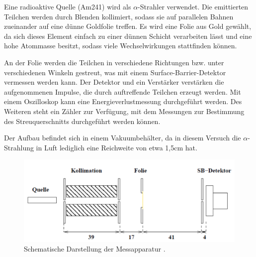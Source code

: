 Eine radioaktive Quelle (Am241) wird als $\alpha$-Strahler verwendet. Die emittierten Teilchen werden durch Blenden
kollimiert, sodass sie auf parallelen Bahnen zueinander auf eine dünne Goldfolie treffen. Es wird eine Folie aus Gold
gewählt, da sich dieses Element einfach zu einer dünnen Schicht verarbeiten lässt und eine hohe Atommasse besitzt, sodass
viele Wechselwirkungen stattfinden können.

An der Folie werden die Teilchen
in verschiedene Richtungen bzw. unter verschiedenen Winkeln gestreut, was mit einem Surface-Barrier-Detektor vermessen
werden kann. Der Detektor und ein Verstärker verstärken die aufgenommenen Impulse, die durch auftreffende Teilchen erzeugt
werden. Mit einem Oszilloskop kann eine Energieverlustmessung durchgeführt werden. Des Weiteren steht ein Zähler zur
Verfügung, mit dem Messungen zur Bestimmung des Streuquerschnitts durchgeführt werden können.

Der Aufbau befindet sich in einem Vakuumbehälter, da in diesem Versuch die $\alpha$-Strahlung in Luft lediglich eine
Reichweite von etwa 1,5cm hat.

\begin{figure}
\centering
\includegraphics[width=\textwidth]{content/aufbau.png}
\caption{Schematische Darstellung der Messapparatur \cite[2]{anleitung}.}
\label{fig:aufbau}
\end{figure}
